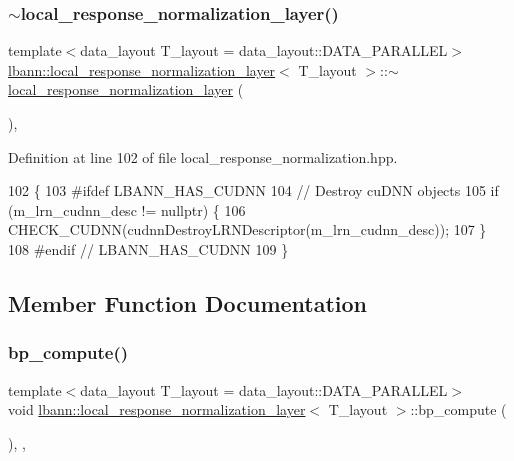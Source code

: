 \subsubsection{\texorpdfstring{$\sim$local\+\_\+response\+\_\+normalization\+\_\+layer()}{~local\_response\_normalization\_layer()}}
{\footnotesize\ttfamily template$<$data\+\_\+layout T\+\_\+layout = data\+\_\+layout\+::\+D\+A\+T\+A\+\_\+\+P\+A\+R\+A\+L\+L\+EL$>$ \\
\hyperlink{classlbann_1_1local__response__normalization__layer}{lbann\+::local\+\_\+response\+\_\+normalization\+\_\+layer}$<$ T\+\_\+layout $>$\+::$\sim$\hyperlink{classlbann_1_1local__response__normalization__layer}{local\+\_\+response\+\_\+normalization\+\_\+layer} (\begin{DoxyParamCaption}{ }\end{DoxyParamCaption})\hspace{0.3cm}{\ttfamily [inline]}, {\ttfamily [override]}}



Definition at line 102 of file local\+\_\+response\+\_\+normalization.\+hpp.


\begin{DoxyCode}
102                                                  \{
103 \textcolor{preprocessor}{  #ifdef LBANN\_HAS\_CUDNN}
104     \textcolor{comment}{// Destroy cuDNN objects}
105     \textcolor{keywordflow}{if} (m\_lrn\_cudnn\_desc != \textcolor{keyword}{nullptr}) \{
106       CHECK\_CUDNN(cudnnDestroyLRNDescriptor(m\_lrn\_cudnn\_desc));
107     \}
108 \textcolor{preprocessor}{  #endif // LBANN\_HAS\_CUDNN}
109   \}
\end{DoxyCode}


\subsection{Member Function Documentation}
\mbox{\label{classlbann_1_1local__response__normalization__layer_ae94544765a459a6609f2c2ebbbc3e9d9}} 
\subsubsection{\texorpdfstring{bp\+\_\+compute()}{bp\_compute()}}
{\footnotesize\ttfamily template$<$data\+\_\+layout T\+\_\+layout = data\+\_\+layout\+::\+D\+A\+T\+A\+\_\+\+P\+A\+R\+A\+L\+L\+EL$>$ \\
void \hyperlink{classlbann_1_1local__response__normalization__layer}{lbann\+::local\+\_\+response\+\_\+normalization\+\_\+layer}$<$ T\+\_\+layout $>$\+::bp\+\_\+compute (\begin{DoxyParamCaption}{ }\end{DoxyParamCaption})\hspace{0.3cm}{\ttfamily [inline]}, {\ttfamily [override]}, {\ttfamily [virtual]}}

